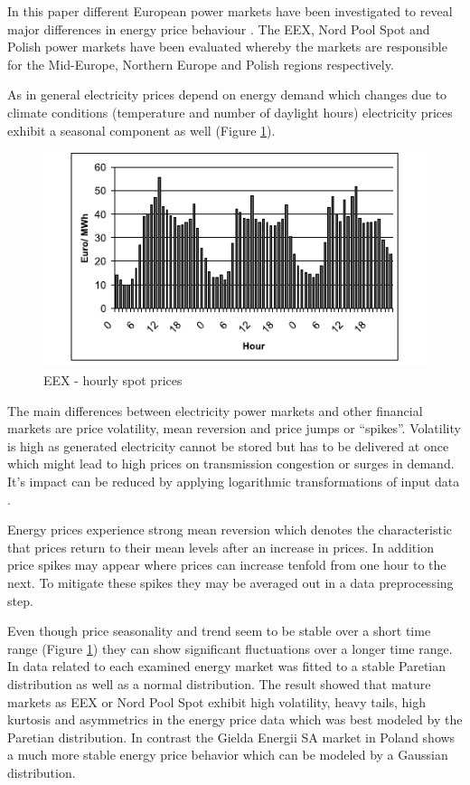 In this paper different European power markets have been investigated to reveal major differences in energy price behaviour \cite{mugele2005stable}. The EEX, Nord Pool Spot and Polish power markets have been evaluated whereby the markets are responsible for the Mid-Europe, Northern Europe and Polish regions respectively. 

As in general electricity prices depend on energy demand \cite{weron2005forecasting} which changes due to climate conditions (temperature and number of daylight hours) electricity prices exhibit a seasonal component as well (Figure \ref{fig:seasonal_behaviour_of_eex_prices}). 

\begin{figure}[htbp]
	\centering
		\includegraphics{figures/state_of_the_art/seasonal_behaviour_of_eex_prices.PNG}
	\caption{EEX - hourly spot prices \cite{mugele2005stable}}
	\label{fig:seasonal_behaviour_of_eex_prices}
\end{figure}

The main differences between electricity power markets and other financial markets are price volatility, mean reversion and price jumps or "`spikes"'. Volatility is high as generated electricity cannot be stored but has to be delivered at once which might lead to high prices on transmission congestion or surges in demand. It's impact can be reduced by applying logarithmic transformations of input data \cite{weron2005forecasting}. 

Energy prices experience strong mean reversion which denotes the characteristic that prices return to their mean levels after an increase in prices. In addition price spikes may appear where prices can increase tenfold from one hour to the next. To mitigate these spikes they may be averaged out in a data preprocessing step. 

Even though price seasonality and trend seem to be stable over a short time range (Figure \ref{fig:seasonal_behaviour_of_eex_prices}) they can show significant fluctuations over a longer time range. In \cite{mugele2005stable} data related to each examined energy market was fitted to a stable Paretian distribution as well as a normal distribution. The result showed that mature markets as EEX or Nord Pool Spot exhibit high volatility, heavy tails, high kurtosis and asymmetrics in the energy price data which was best modeled by the Paretian distribution. In contrast the Gielda Energii SA market in Poland shows a much more stable energy price behavior which can be modeled by a Gaussian distribution. 

